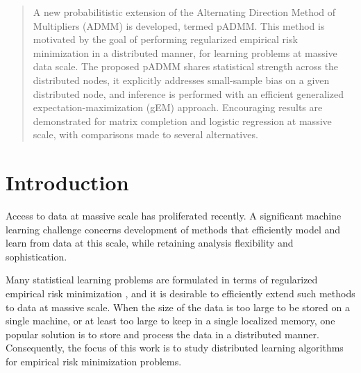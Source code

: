 \documentclass{article}
\newcommand{\1}[0]{\ensuremath{\boldsymbol{1}}\xspace}
\begin{document}

\begin{abstract} 
A new probabilitistic extension of the Alternating Direction Method of Multipliers (ADMM) is developed, termed pADMM. This method is motivated by the goal of  performing regularized empirical risk minimization in a distributed manner, for learning problems at massive data scale. The proposed pADMM shares statistical strength across the distributed nodes, it explicitly addresses small-sample bias on a given distributed node, and inference is performed with an efficient generalized expectation-maximization (gEM) approach. Encouraging results are demonstrated for matrix completion and logistic regression at massive scale, with comparisons made to several alternatives.

\end{abstract} 

\section{Introduction}

Access to data at massive scale has proliferated recently. A significant machine learning challenge concerns development of methods that efficiently model and learn from data at this scale, while retaining analysis flexibility and sophistication.

Many statistical learning problems are formulated in terms of regularized empirical risk minimization \cite{Hastie2001}, and it is desirable to efficiently extend such methods to data at massive scale. When the size of the data is too large to be stored on a single machine, or at least too large to keep in a single localized memory, one popular solution is to store and process the data in a distributed manner. Consequently, the focus of this work is to study distributed learning algorithms \cite{Bertsekas1989} for empirical risk minimization problems.
\end{document}
